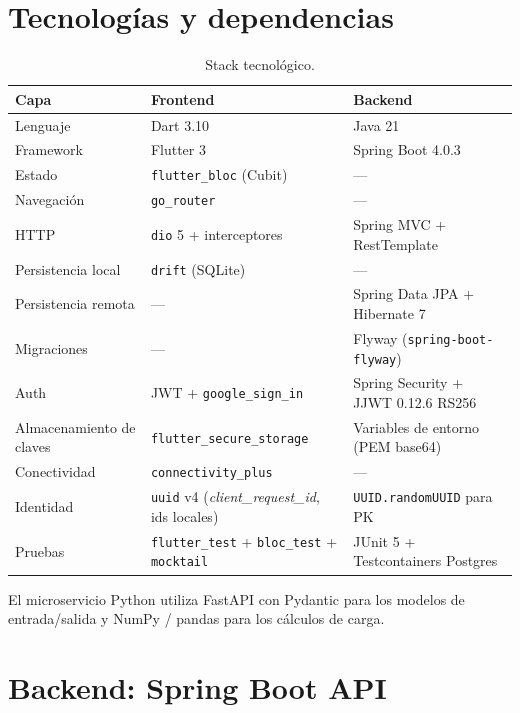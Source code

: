\documentclass[11pt,a4paper]{article}
\begin{document}
\section{Tecnologías y dependencias}

\begin{table}[H]
\centering
\begin{tabularx}{\textwidth}{lXX}
\toprule
\textbf{Capa} & \textbf{Frontend} & \textbf{Backend} \\
\midrule
Lenguaje & Dart 3.10 & Java 21 \\
Framework & Flutter 3 & Spring Boot 4.0.3 \\
Estado & \texttt{flutter\_bloc} (Cubit) & — \\
Navegación & \texttt{go\_router} & — \\
HTTP & \texttt{dio} 5 + interceptores & Spring MVC + RestTemplate \\
Persistencia local & \texttt{drift} (SQLite) & — \\
Persistencia remota & — & Spring Data JPA + Hibernate 7 \\
Migraciones & — & Flyway (\texttt{spring-boot-flyway}) \\
Auth & JWT + \texttt{google\_sign\_in} & Spring Security + JJWT 0.12.6 RS256 \\
Almacenamiento de claves & \texttt{flutter\_secure\_storage} & Variables de entorno (PEM base64) \\
Conectividad & \texttt{connectivity\_plus} & — \\
Identidad & \texttt{uuid} v4 (\textit{client\_request\_id}, ids locales) & \texttt{UUID.randomUUID} para PK \\
Pruebas & \texttt{flutter\_test} + \texttt{bloc\_test} + \texttt{mocktail} & JUnit 5 + Testcontainers Postgres \\
\bottomrule
\end{tabularx}
\caption{Stack tecnológico.}
\end{table}

El microservicio Python utiliza FastAPI con Pydantic para los modelos de entrada/salida y NumPy / pandas para los cálculos de carga.

\section{Backend: Spring Boot API}
\end{document}
